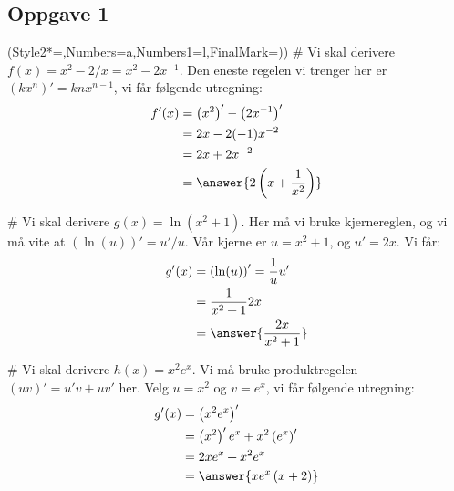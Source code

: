 \subsection*{Oppgave 1}
\begin{easylist}[enumerate]
	\ListProperties(Style2*=,Numbers=a,Numbers1=l,FinalMark={)})
	# Vi skal derivere $f(x) = x^2 - 2/x = x^2 - 2x^{-1}$.
	Den eneste regelen vi trenger her er $\left(kx^n\right)' = knx^{n-1}$, vi får følgende utregning:
	\begin{align*}
		f'(x) &= \left(x^2\right)' - \left(2x^{-1}\right)' \\
			&= 2x - 2(-1)x^{-2} \\
			&= 2x + 2x^{-2} \\
			&= \answer{2 \left( x + \frac{1}{x^2}\right)}
	\end{align*}
	
	# Vi skal derivere $g(x) = \ln \left( x^2 + 1\right)$. Her må vi bruke kjernereglen, og vi må vite at $\left( \ln (u)\right)' = u'/u$. Vår kjerne er $u = x^2 + 1$, og $u' = 2x$. Vi får:
	\begin{align*}
	g'(x) &= \left( \ln (u)\right)' = \frac{1}{u} u' \\
	&= \frac{1}{x^2 + 1} 2x \\
	&= \answer{\frac{2x}{x^2 + 1}  }
	\end{align*}
	
	# Vi skal derivere $h(x) = x^2 e^x$. Vi må bruke produktregelen $\left(uv\right)' = u'v + uv'$ her. Velg $u = x^2$ og $v = e^x$, vi får følgende utregning:
	\begin{align*}
	g'(x) &= \left( x^2 e^x \right)' \\
	&= \left( x^2  \right)' e^x + x^2 \left( e^x\right)' \\
	&= 2x e^x + x^2 e^x \\
	&= \answer{x e^x \left(x+2\right)}
	\end{align*}
\end{easylist}

